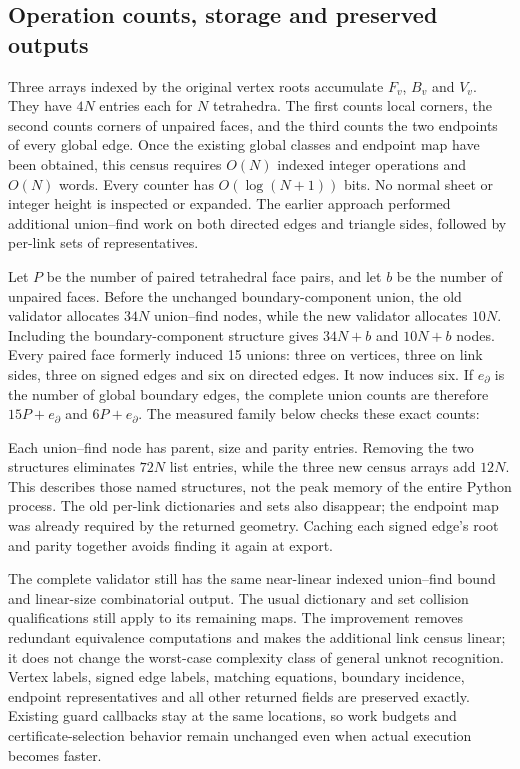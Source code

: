 \subsection{Operation counts, storage and preserved outputs}

Three arrays indexed by the original vertex roots accumulate $F_v$, $B_v$
and $V_v$. They have $4N$ entries each for $N$ tetrahedra. The first counts
local corners, the second counts corners of unpaired faces, and the third
counts the two endpoints of every global edge. Once the existing global
classes and endpoint map have been obtained, this census requires $O(N)$
indexed integer operations and $O(N)$ words. Every counter has
$O(\log(N+1))$ bits. No normal sheet or integer height is inspected or expanded.
The earlier approach performed additional union--find work on both directed
edges and triangle sides, followed by per-link sets of representatives.

Let $P$ be the number of paired tetrahedral face pairs, and let $b$ be the
number of unpaired faces. Before the unchanged boundary-component union,
the old validator allocates $34N$ union--find nodes, while the new validator
allocates $10N$. Including the boundary-component structure gives $34N+b$
and $10N+b$ nodes. Every paired face formerly induced 15 unions: three on
vertices, three on link sides, three on signed edges and six on directed
edges. It now induces six. If $e_\partial$ is the number of global boundary
edges, the complete union counts are therefore $15P+e_\partial$ and
$6P+e_\partial$. The measured family below checks these exact counts:
\begin{center}
\small

\end{center}
Each union--find node has parent, size and parity entries. Removing the two
structures eliminates $72N$ list entries, while the three new census arrays
add $12N$. This describes those named structures, not the peak memory of the
entire Python process. The old per-link dictionaries and sets also disappear;
the endpoint map was already required by the returned geometry. Caching each
signed edge's root and parity together avoids finding it again at export.

The complete validator still has the same near-linear indexed union--find
bound and linear-size combinatorial output. The usual dictionary and set
collision qualifications still apply to its remaining maps. The improvement
removes redundant equivalence computations and makes the additional link
census linear; it does not change the worst-case complexity class of general
unknot recognition. Vertex labels, signed edge labels, matching equations,
boundary incidence, endpoint representatives and all other returned fields
are preserved exactly. Existing guard callbacks stay at the same locations,
so work budgets and certificate-selection behavior remain unchanged even
when actual execution becomes faster.


